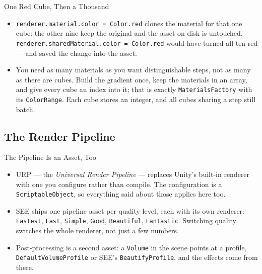 \begin{solutionframe}{One Red Cube, Then a Thousand}
  \begin{itemize}
    \item \texttt{renderer.material.color = Color.red} clones the material for
      that one cube: the other nine keep the original and the asset on disk is
      untouched. \texttt{renderer.sharedMaterial.color = Color.red} would have
      turned all ten red --- and saved the change into the asset.
    \item You need as many materials as you want distinguishable steps, not as
      many as there are cubes. Build the gradient once, keep the materials in
      an array, and give every cube an index into it; that is exactly
      \texttt{MaterialsFactory} with its \texttt{ColorRange}. Each cube stores
      an integer, and all cubes sharing a step still batch.
  \end{itemize}
  \vspace{1ex}

\end{solutionframe}

\subsection{The Render Pipeline}

\begin{frame}{The Pipeline Is an Asset, Too}
  \begin{itemize}
    \item URP --- the \emph{Universal Render Pipeline} --- replaces Unity's
      built-in renderer with one you configure rather than compile. The
      configuration is a \texttt{ScriptableObject}, so everything said about
      those applies here too.
    \item SEE ships one pipeline asset per quality level, each with its own
      renderer: \texttt{Fastest}, \texttt{Fast}, \texttt{Simple},
      \texttt{Good}, \texttt{Beautiful}, \texttt{Fantastic}. Switching quality
      switches the whole renderer, not just a few numbers.
    \item Post-processing is a second asset: a \texttt{Volume} in the scene
      points at a profile, \texttt{DefaultVolumeProfile} or SEE's
      \texttt{BeautifyProfile}, and the effects come from there.
  \end{itemize}
  \vspace{2ex}

\end{frame}

